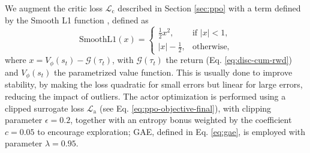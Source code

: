 We augment the critic loss $\mathcal{L}_{\text{c}}$ described in Section \ref{sec:ppo} with a term defined by the Smooth L1 function \cite{smoothl1}, defined as
\[
\text{SmoothL1}(x) =
\begin{cases}
\frac{1}{2}x^{2}, & \text{if } |x| < 1,\\[5 pt]
|x| - \frac{1}{2}, & \text{otherwise},
\end{cases}
\]
where $x = V_\phi(s_t) - \mathcal{G}(\tau_t)$, with $\mathcal{G}(\tau_t)$ the return (Eq. \ref{eq:disc-cum-rwd}) and $V_\phi(s_t)$ the parametrized value function. This is usually done to improve stability, by making the loss quadratic for small errors but linear for large errors, reducing the impact of outliers.
The actor optimization is performed using a clipped surrogate loss $\mathcal{L}_{\text{a}}$ (see Eq. \ref{eq:ppo-objective-final}), with clipping parameter $\epsilon = 0.2$, together with an entropy bonus weighted by the coefficient $c=0.05$ to encourage exploration; GAE, defined in Eq. \ref{eq:gae}, is employed with parameter $\lambda = 0.95$.
